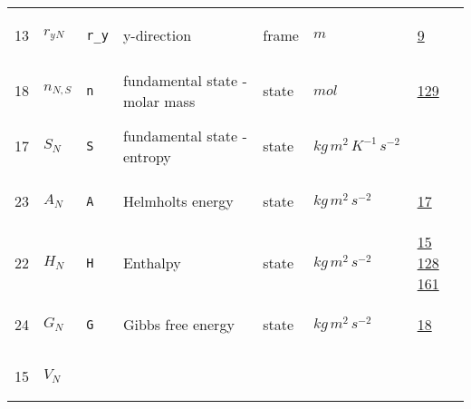 \begin{longtable}{|p{1cm}|p{2.5cm}|p{4.5cm}|p{8cm}|p{3.0cm}|p{3cm}|p{1cm}|}
                 \\
            13
             & \hypertarget{"v:13"}{ $ {{r_y}}{_{N}} $}
             & \verb|r_y|
             & y-direction
             & \begin{lay}frame \end{lay}
             & $ m  $
             &                 \hyperlink{"e:9"}{ 9 }
                 \\
            18
             & \hypertarget{"v:18"}{ $ {n}{_{N, S}} $}
             & \verb|n|
             & fundamental state - molar mass
             & \begin{lay}state \end{lay}
             & $ mol \, $
             &                 \hyperlink{"e:129"}{ 129 }
                 \\
            17
             & \hypertarget{"v:17"}{ $ {S}{_{N}} $}
             & \verb|S|
             & fundamental state - entropy
             & \begin{lay}state \end{lay}
             & $ kg \,m^{2} \,K^{-1} \,s^{-2} \, $
             & \\
            23
             & \hypertarget{"v:23"}{ $ {A}{_{N}} $}
             & \verb|A|
             & Helmholts energy
             & \begin{lay}state \end{lay}
             & $ kg \,m^{2} \,s^{-2} \, $
             &                 \hyperlink{"e:17"}{ 17 }
                 \\
            22
             & \hypertarget{"v:22"}{ $ {H}{_{N}} $}
             & \verb|H|
             & Enthalpy
             & \begin{lay}state \end{lay}
             & $ kg \,m^{2} \,s^{-2} \, $
             &                 \hyperlink{"e:15"}{ 15 }
                                 \hyperlink{"e:128"}{ 128 }
                                 \hyperlink{"e:161"}{ 161 }
                 \\
            24
             & \hypertarget{"v:24"}{ $ {G}{_{N}} $}
             & \verb|G|
             & Gibbs free energy
             & \begin{lay}state \end{lay}
             & $ kg \,m^{2} \,s^{-2} \, $
             &                 \hyperlink{"e:18"}{ 18 }
                 \\
            15
             & \hypertarget{"v:15"}{ $ {V}{_{N}} $}

\end{longtable}
